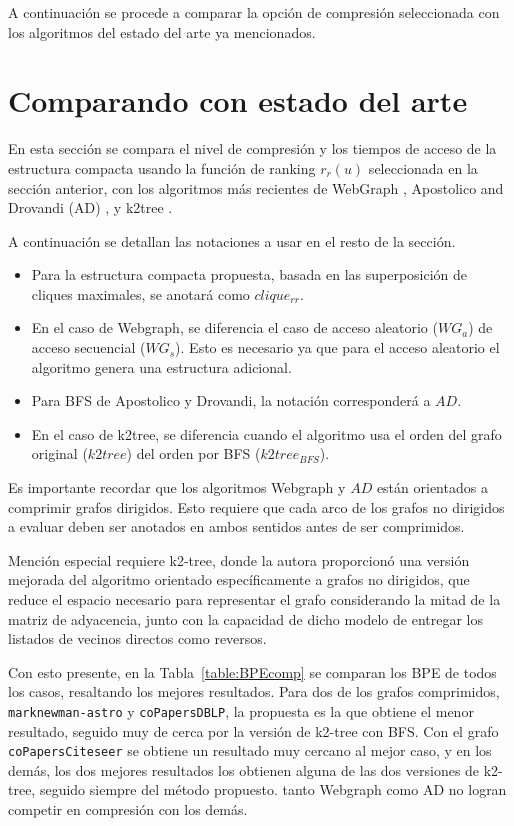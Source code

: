 

A continuación se procede a comparar la opción de compresión seleccionada con los algoritmos del estado del arte ya mencionados.




\section{Comparando con estado del arte}
En esta sección se compara el nivel de compresión y los tiempos de acceso de la estructura compacta usando la función de ranking $r_{r}(u)$ seleccionada en la sección anterior, con los algoritmos más recientes de WebGraph \cite{boldi2011layered}, Apostolico and Drovandi (AD) \cite{apostolico2009graph}, y k2tree \cite{brisaboa2014compact}.

A continuación se detallan las notaciones a usar en el resto de la sección.

\begin{itemize}
	\item Para la estructura compacta propuesta, basada en las superposición de cliques maximales, se anotará como $clique_{rr}$.
	\item En el caso de Webgraph, se diferencia el caso de acceso aleatorio ($WG_{a}$) de acceso secuencial ($WG_{s}$). Esto es necesario ya que para el acceso aleatorio el algoritmo genera una estructura adicional.
	\item Para BFS de Apostolico y Drovandi, la notación corresponderá a $AD$.
	\item En el caso de k2tree, se diferencia cuando el algoritmo usa el orden del grafo original ($k2tree$) del orden por BFS ($k2tree_{BFS}$).
\end{itemize}

Es importante recordar que los algoritmos Webgraph y $AD$ están orientados a comprimir grafos dirigidos. Esto requiere que cada arco de los grafos no dirigidos a evaluar deben ser anotados en ambos sentidos antes de ser comprimidos. 

Mención especial requiere k2-tree, donde la autora proporcionó una versión mejorada del algoritmo orientado específicamente a grafos no dirigidos, que reduce el espacio necesario para representar el grafo considerando la mitad de la matriz de adyacencia, junto con la capacidad de dicho modelo de entregar los listados de vecinos directos como reversos.

Con esto presente, en la Tabla~\ref{table:BPEcomp} se comparan los BPE de todos los casos, resaltando los mejores resultados. Para dos de los grafos comprimidos, \texttt{marknewman-astro} y \texttt{coPapersDBLP}, la propuesta es la que obtiene el menor resultado, seguido muy de cerca por la versión de k2-tree con BFS. Con el grafo \texttt{coPapersCiteseer} se obtiene un resultado muy cercano al mejor caso, y en los demás, los dos mejores resultados los obtienen alguna de las dos versiones de k2-tree, seguido siempre del método propuesto. tanto Webgraph como AD no logran competir en compresión con los demás.

